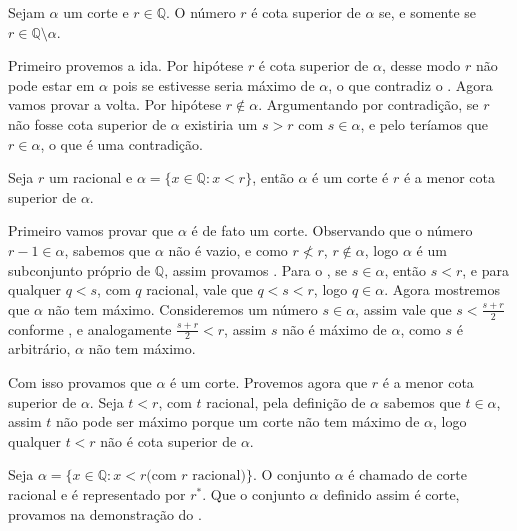 \documentclass[../main.tex]{subfiles}
\begin{document}
\begin{prop}
    Sejam $\alpha$ um corte e $r \in \mathbb{Q}$. O número $r$ é cota superior de $\alpha$ se, e somente se $r \in \mathbb{Q} \setminus \alpha$. 
\end{prop}
\begin{dem}
    Primeiro provemos a ida. Por hipótese $r$ é cota superior de $\alpha$, desse modo $r$ não pode estar em $\alpha$ pois se estivesse seria máximo de $\alpha$, o que contradiz o .
    Agora vamos provar a volta. Por hipótese $r \not\in \alpha$. Argumentando por contradição, se $r$ não fosse cota superior de $\alpha$ existiria um $s > r$ com $s \in \alpha$, e pelo  teríamos que $r \in \alpha$, o que é uma contradição.
\end{dem}
\begin{teo}\label{reais-teo-corteRacional}
    Seja $r$ um racional e $\alpha = \{ x \in \mathbb{Q} : x < r \}$, então $\alpha$ é um corte é $r$ é a menor cota superior de $\alpha$.
\end{teo}
\begin{dem}
    
    Primeiro vamos provar que $\alpha$ é de fato um corte. Observando que o número $r - 1 \in \alpha$, sabemos que $\alpha$ não é vazio, e como $r \not< r$, $r \not\in \alpha$, logo $\alpha$ é um subconjunto próprio de $\mathbb{Q}$, assim provamos .
    Para o , se $s \in \alpha$, então $s < r$, e para qualquer $q < s$, com $q$ racional, vale que $q < s < r$, logo $q \in \alpha$.
    Agora mostremos que $\alpha$ não tem máximo. Consideremos um número $s \in \alpha$, assim vale que $s < \frac{s+r}{2}$ conforme , e analogamente $\frac{s+r}{2} < r$, assim $s$ não é máximo de $\alpha$, como $s$ é arbitrário, $\alpha$ não tem máximo.

    Com isso provamos que $\alpha$ é um corte. Provemos agora que $r$ é a menor cota superior de $\alpha$. Seja $t < r$, com $t$ racional, pela definição de $\alpha$ sabemos que $t \in \alpha$, assim $t$ não pode ser máximo porque um corte não tem máximo de $\alpha$, logo qualquer $t < r$ não é cota superior de $\alpha$.
\end{dem}

\begin{defi}
    Seja $\alpha = \{ x \in \mathbb{Q} : x < r \text{(com $r$ racional)} \}$. O conjunto $\alpha$ é chamado de corte racional e é representado por $r^*$. Que o conjunto $\alpha$ definido assim é corte, provamos na demonstração do .
\end{defi}
\end{document}
